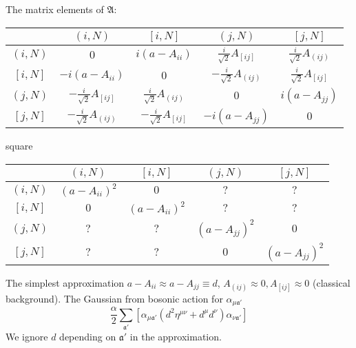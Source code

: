 The matrix elements of $\mathfrak{A}$:
\begin{table}[ht]
\begin{tabular}{|c|c|c|c|c|}
\hline
        & $(i,N)$                       & $[i,N]$                                                                 & $(j,N)$                       & $[j,N]$                      \\ \hline
$(i,N)$ & $0$                           & $i(a-A_{ii})$                                                           & $\frac{i}{\sqrt{2}}A_{[ij]}$  & $\frac{i}{\sqrt{2}}A_{(ij)}$ \\ \hline
$[i,N]$ & $-i(a-A_{ii})$                & $0$                                                                     & $-\frac{i}{\sqrt{2}}A_{(ij)}$ & $\frac{i}{\sqrt{2}}A_{[ij]}$ \\ \hline
$(j,N)$ & $-\frac{i}{\sqrt{2}}A_{[ij]}$ & $\frac{i}{\sqrt{2}}A_{(ij)}$                                            & $0$                           & $i(a-A_{jj})$                \\ \hline
$[j,N]$ & $-\frac{i}{\sqrt{2}}A_{(ij)}$ & $-\frac{i}{\sqrt{2}}A_{[ij]}$ & $-i(a-A_{jj})$                & $0$                          \\ \hline
\end{tabular}
\end{table}

square
\begin{table}[ht]
\begin{tabular}{|c|c|c|c|c|}
\hline
        & $(i,N)$                       & $[i,N]$                                                                 & $(j,N)$                       & $[j,N]$                      \\ \hline
	$(i,N)$ & $(a-A_{ii})^2$                           & $0$                                                           & $?$  & $?$ \\ \hline
	$[i,N]$ & $0$                & $(a-A_{ii})^2$                                                                     & $?$ & $?$ \\ \hline
	$(j,N)$ & $?$ & $?$                                            & $(a-A_{jj})^2$                           & $0$                \\ \hline
	$[j,N]$ & $?$ & $?$ & $0$                & $(a-A_{jj})^2$                          \\ \hline
\end{tabular}
\end{table}

The simplest approximation $a-A_{ii} \approx a- A_{jj} \equiv d$,
$A_{(ij)} \approx 0, A_{[ij]} \approx 0$ (classical background).
The Gaussian from bosonic action for $\alpha_{\mu \mathfrak{a}'}$
\begin{equation}
	\frac{\alpha}{2} \sum_{\mathfrak{a}'}
	\left[ \alpha_{\mu \mathfrak{a}'} 
		(d^2 \eta^{\mu\nu} + d^\mu d^\nu) 
	\alpha_{\nu \mathfrak{a}'}\right]
\end{equation}
We ignore $d$ depending on $\mathfrak{a}'$ in the approximation.

